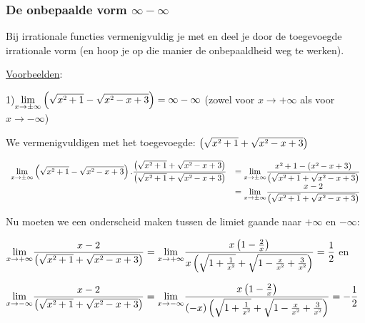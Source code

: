 \subsubsection{De onbepaalde vorm $\infty-\infty$}

Bij irrationale functies vermenigvuldig je met en deel je door de
toegevoegde irrationale vorm (en hoop je op die manier de onbepaaldheid
weg te werken).




\uline{Voorbeelden}:




1)${\displaystyle {\displaystyle \lim_{x\to\pm\infty}}\left(\sqrt{x\text{\texttwosuperior}+1}-\sqrt{x\text{\texttwosuperior}-x+3}\right)=\infty-\infty}$
(zowel voor $x\rightarrow+\infty$ als voor $x\rightarrow-\infty$)

We vermenigvuldigen met het toegevoegde: $\left(\sqrt{x\text{\texttwosuperior}+1}+\sqrt{x\text{\texttwosuperior}-x+3}\right)$

$\begin{array}{cl}
{\displaystyle {\displaystyle \lim_{x\to\pm\infty}}\left(\sqrt{x\text{\texttwosuperior}+1}-\sqrt{x\text{\texttwosuperior}-x+3}\right).\frac{\left(\sqrt{x\text{\texttwosuperior}+1}+\sqrt{x\text{\texttwosuperior}-x+3}\right)}{\left(\sqrt{x\text{\texttwosuperior}+1}+\sqrt{x\text{\texttwosuperior}-x+3}\right)}} & {\displaystyle ={\displaystyle \lim_{x\to\pm\infty}}\frac{x\text{\texttwosuperior}+1-(x\text{\texttwosuperior}-x+3)}{\left(\sqrt{x\text{\texttwosuperior}+1}+\sqrt{x\text{\texttwosuperior}-x+3}\right)}}\\
 & {\displaystyle ={\displaystyle \lim_{x\to\pm\infty}}\frac{x-2}{\left(\sqrt{x\text{\texttwosuperior}+1}+\sqrt{x\text{\texttwosuperior}-x+3}\right)}}
\end{array}$

Nu moeten we een onderscheid maken tussen de limiet gaande naar $+\infty$
en $-\infty$:

${\displaystyle {\displaystyle \lim_{x\to+\infty}}\frac{x-2}{\left(\sqrt{x\text{\texttwosuperior}+1}+\sqrt{x\text{\texttwosuperior}-x+3}\right)}={\displaystyle \lim_{x\to+\infty}}\frac{x\left(1-\frac{2}{x}\right)}{x\left(\sqrt{1+\frac{1}{x\text{\texttwosuperior}}}+\sqrt{1-\frac{x}{x\text{\texttwosuperior}}+\frac{3}{x\text{\texttwosuperior}}}\right)}=\frac{1}{2}}$ en

${\displaystyle {\displaystyle \lim_{x\to-\infty}}\frac{x-2}{\left(\sqrt{x\text{\texttwosuperior}+1}+\sqrt{x\text{\texttwosuperior}-x+3}\right)}={\displaystyle \lim_{x\to-\infty}}\frac{x\left(1-\frac{2}{x}\right)}{(-x)\left(\sqrt{1+\frac{1}{x\text{\texttwosuperior}}}+\sqrt{1-\frac{x}{x\text{\texttwosuperior}}+\frac{3}{x\text{\texttwosuperior}}}\right)}=-\frac{1}{2}}$


